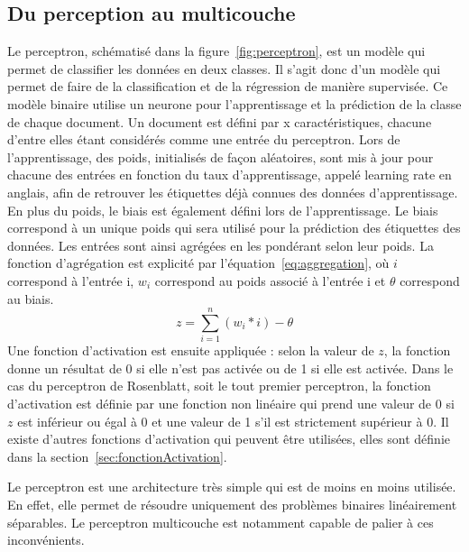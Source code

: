 \subsection{Du perception au multicouche}
Le perceptron, schématisé dans la figure~\ref{fig:perceptron}, est un modèle qui permet de classifier les données en deux classes. Il s'agit donc d'un modèle qui permet de faire de la classification et de la régression de manière supervisée. Ce modèle binaire utilise un neurone pour l'apprentissage et la prédiction de la classe de chaque document. Un document est défini par x caractéristiques, chacune d'entre elles étant considérés comme une entrée du perceptron. Lors de l'apprentissage, des poids, initialisés de façon aléatoires, sont mis à jour pour chacune des entrées en fonction du taux d'apprentissage, appelé learning rate en anglais, afin de retrouver les étiquettes déjà connues des données d'apprentissage. En plus du poids, le biais est également défini lors de l'apprentissage. Le biais correspond à un unique poids qui sera utilisé pour la prédiction des étiquettes des données. Les entrées sont ainsi agrégées en les pondérant selon leur poids. La fonction d'agrégation est explicité par l'équation~\ref{eq:aggregation}, où $i$ correspond à l'entrée i, $w_i$ correspond au poids associé à l'entrée i et $\theta$ correspond au biais.
\begin{equation}
  z = \sum_{i=1}^{n}(w_i*i) - \theta
\end{equation}
Une fonction d'activation est ensuite appliquée : selon la valeur de $z$, la fonction donne un résultat de 0 si elle n'est pas activée ou de 1 si elle est activée. Dans le cas du perceptron de Rosenblatt, soit le tout premier perceptron, la fonction d'activation est définie par une fonction non linéaire qui prend une valeur de 0 si $z$ est inférieur ou égal à 0 et une valeur de 1 s'il est strictement supérieur à 0.
Il existe d'autres fonctions d'activation qui peuvent être utilisées, elles sont définie dans la section~\ref{sec:fonctionActivation}.

Le perceptron est une architecture très simple qui est de moins en moins utilisée. En effet, elle permet de résoudre uniquement des problèmes binaires linéairement séparables. Le perceptron multicouche est notamment capable de palier à ces inconvénients.

